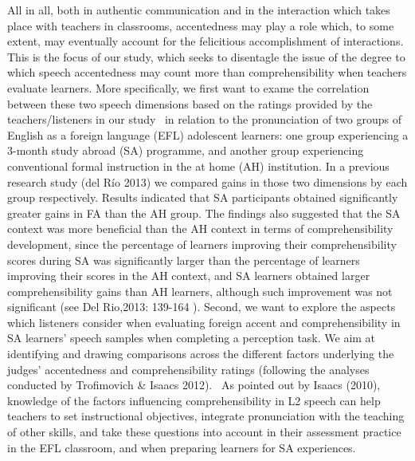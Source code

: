 \documentclass[12pt]{article}
\newenvironment{styleStandard}{\setlength\leftskip{0cm}\setlength\rightskip{0cm plus 1fil}\setlength\parindent{0cm}\setlength\parfillskip{0pt plus 1fil}\setlength\parskip{0in plus 1pt}\writerlistparindent\writerlistleftskip\leavevmode\normalfont\normalsize\writerlistlabel\ignorespaces}{\unskip\vspace{0.111in plus 0.0111in}\par}
\newcommand\writerlistleftskip{}
\newcommand\writerlistparindent{}
\newcommand\writerlistlabel{}
\begin{document}
\begin{styleStandard}
All in all, both in authentic communication and in the interaction which takes place with teachers in classrooms, accentedness may play a role which, to some extent, may eventually account for the felicitious accomplishment of interactions. This is the focus of our study, which seeks to disentagle the issue of the degree to which speech accentedness may count more than comprehensibility when teachers evaluate learners. More specifically, we first want to exame the correlation between these two speech dimensions based on the ratings provided by the teachers/listeners in our study \ in relation to the pronunciation of two groups of English as a foreign language (EFL) adolescent learners: one group experiencing a 3-month study abroad (SA) programme, and another group experiencing conventional formal instruction in the at home (AH) institution. In a previous research study (del Río 2013) we compared gains in those two dimensions by each group respectively. Results indicated that SA participants obtained significantly greater gains in FA than the AH group. The findings also suggested that the SA context was more beneficial than the AH context in terms of comprehensibility development, since the percentage of learners improving their comprehensibility scores during SA was significantly larger than the percentage of learners improving their scores in the AH context, and SA learners obtained larger comprehensibility gains than AH learners, although such improvement was not significant (see Del Rio,2013: 139-164 ). Second, we want to explore the aspects which listeners consider when evaluating foreign accent and comprehensibility in SA learners’ speech samples when completing a perception task. We aim at identifying and drawing comparisons across the different factors underlying the judges’ accentedness and comprehensibility ratings (following the analyses conducted by Trofimovich \& Isaacs 2012). \ As pointed out by Isaacs (2010), knowledge of the factors influencing comprehensibility in L2 speech can help teachers to set instructional objectives, integrate pronunciation with the teaching of other skills, and take these questions into account in their assessment practice in the EFL classroom, and when preparing learners for SA experiences.
\end{styleStandard}
\end{document}
